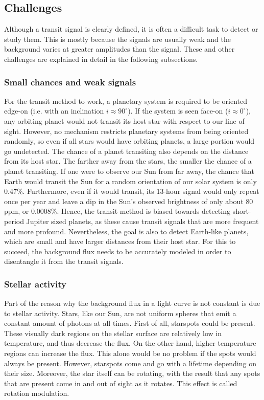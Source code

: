 \subsection{Challenges}
\label{sec:challenges}

Although a transit signal is clearly defined, it is often a difficult task to detect or study them. This is mostly because the signals are usually weak and the background varies at greater amplitudes than the signal. These and other challenges are explained in detail in the following subsections.

\subsubsection{Small chances and weak signals}

For the transit method to work, a planetary system is required to be oriented edge-on (i.e. with an inclination $i \approx 90^\circ$). If the system is seen face-on ($i \approx 0^\circ$), any orbiting planet would not transit its host star with respect to our line of sight. However, no mechanism restricts planetary systems from being oriented randomly, so even if all stars would have orbiting planets, a large portion would go undetected. The chance of a planet transiting also depends on the distance from its host star. The farther away from the stars, the smaller the chance of a planet transiting.  If one were to observe our Sun from far away, the chance that Earth would transit the Sun for a random orientation of our solar system is only 0.47\%. Furthermore, even if it would transit, its 13-hour signal would only repeat once per year and leave a dip in the Sun's observed brightness of only about 80 ppm, or 0.0008\%. Hence, the transit method is biased towards detecting short-period Jupiter sized planets, as these cause transit signals that are more frequent and more profound. Nevertheless, the goal is also to detect Earth-like planets, which are small and have larger distances from their host star. For this to succeed, the background flux needs to be accurately modeled in order to disentangle it from the transit signals.

\subsubsection{Stellar activity}

Part of the reason why the background flux in a light curve is not constant is due to stellar activity. Stars, like our Sun, are not uniform spheres that emit a constant amount of photons at all times. First of all, starspots could be present. These visually dark regions on the stellar surface are relatively low in temperature, and thus decrease the flux. On the other hand, higher temperature regions can increase the flux. This alone would be no problem if the spots would always be present. However, starspots come and go with a lifetime depending on their size. Moreover, the star itself can be rotating, with the result that any spots that are present come in and out of sight as it rotates. This effect is called rotation modulation. 

